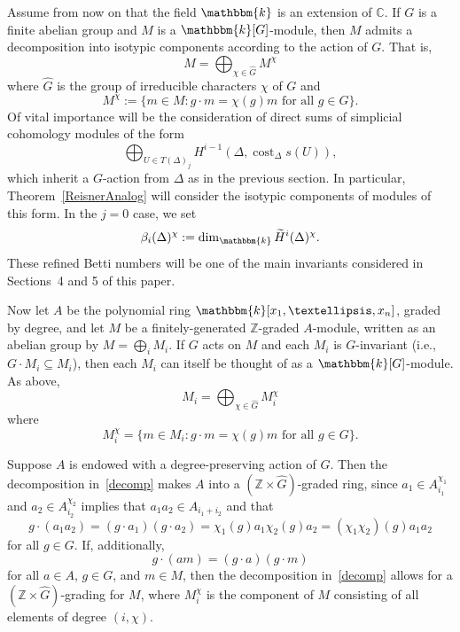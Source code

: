 \documentclass[10pt]{amsart}
\theoremstyle{definition}
\newcommand{\ie}{i.e.}
\DeclareMathOperator\cost{cost}
\newcommand{\field}{\mathbbm{k}}
\newcommand{\CC}{{\mathbb C}}
\newcommand{\ZZ}{{\mathbb Z}}
\begin{document}
Assume from now on that the field $\field$ is an extension of $\CC$. If $G$ is a finite abelian group and $M$ is a $\field[G]$-module, then $M$ admits a decomposition into isotypic components according to the action of $G$. That is,
\[
M=\bigoplus_{\chi\in\hat{G}} M^\chi
\]
where $\hat{G}$ is the group of irreducible characters $\chi$ of $G$ and
\[
M^\chi := \{ m\in M: g\cdot m = \chi(g) m\text{ for all $g\in G$}\}.
\]
Of vital importance will be the consideration of direct sums of simplicial cohomology modules of the form
\[
\bigoplus_{U\in T(\Delta)_j}H^{i-1}(\Delta, \cost_\Delta s(U)),
\]
which inherit a $G$-action from $\Delta$ as in the previous section. In particular, Theorem~\ref{ReisnerAnalog} will consider the isotypic components of modules of this form. In the $j=0$ case, we set
\begin{equation}\label{bettinotation}
\beta_i(\Delta)^\chi:=\dim_\field \widetilde{H}^i(\Delta)^\chi.
\end{equation}
These refined Betti numbers will be one of the main invariants considered in Sections~4 and 5 of this paper.


Now let $A$ be the polynomial ring $\field[x_1, \ldots, x_n]$, graded by degree, and let $M$ be a finitely-generated $\ZZ$-graded $A$-module, written as an abelian group by $M=\bigoplus_i M_i$. If $G$ acts on $M$ and each $M_i$ is $G$-invariant (\ie, $G\cdot M_i\subseteq M_i$), then each $M_i$ can itself be thought of as a $\field[G]$-module. As above,
\begin{equation}\label{decomp}
M_i=\bigoplus_{\chi\in\hat{G}} M_i^\chi
\end{equation}
where
\[
M_i^\chi=\{m\in M_i:g\cdot m = \chi(g)m\text{ for all $g\in G$}\}.
\]

Suppose $A$ is endowed with a degree-preserving action of $G$. Then the decomposition in~\eqref{decomp} makes $A$ into a $(\ZZ\times \hat{G})$-graded ring, since $a_1\in A_{i_1}^{\chi_1}$ and $a_2\in A_{i_2}^{\chi_2}$ implies that $a_1a_2\in A_{i_1+i_2}$ and that
\[
g\cdot(a_1a_2)=(g\cdot a_1)(g\cdot a_2)=\chi_1(g)a_1\chi_2(g)a_2=(\chi_1\chi_2)(g)a_1a_2
\]
for all $g\in G$. If, additionally,
\begin{equation}\label{compatible}
g\cdot(am)=(g\cdot a)(g\cdot m)
\end{equation}
for all $a\in A$, $g\in G$, and $m\in M$, then the decomposition in~\eqref{decomp} allows for a $(\ZZ\times \hat{G})$-grading for $M$, where $M_i^\chi$ is the component of $M$ consisting of all elements of degree $(i, \chi)$.
\end{document}
